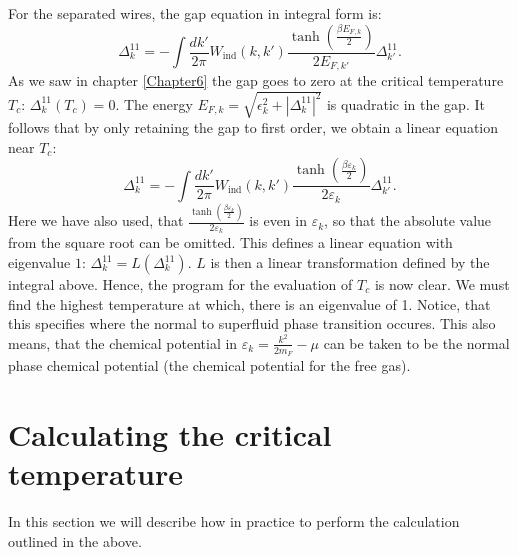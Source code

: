 For the separated wires, the gap equation in integral form is:
\begin{equation}
\Delta^{11}_k = - \int \frac{dk'}{2\pi} W_{\text{ind}}(k,k')\frac{\tanh\left(\frac{\beta E_{F,k}}{2}\right)}{2E_{F,k'}}\Delta^{11}_{k'}. \nonumber
\end{equation} 
As we saw in chapter \ref{Chapter6} the gap goes to zero at the critical temperature $T_c$: $\Delta^{11}_k(T_c) = 0$. The energy $E_{F,k} = \sqrt{\epsilon_k^2 + |\Delta^{11}_k|^2}$ is quadratic in the gap. It follows that by only retaining the gap to first order, we obtain a linear equation near $T_c$:
\begin{equation}
\Delta^{11}_k = - \int \frac{dk'}{2\pi} W_{\text{ind}}(k,k')\frac{\tanh\left(\frac{\beta \varepsilon_k}{2}\right)}{2\varepsilon_k} \Delta^{11}_{k'}.
\label{eq.GapequationIntegralLinear}
\end{equation} 
Here we have also used, that $\frac{\tanh\left(\frac{\beta \varepsilon_k}{2}\right)}{2\varepsilon_k}$ is even in $\varepsilon_k$, so that the absolute value from the square root can be omitted. This defines a linear equation with eigenvalue $1$: $\Delta^{11}_k = L(\Delta^{11}_k)$. $L$ is then a linear transformation defined by the integral above. Hence, the program for the evaluation of $T_c$ is now clear. We must find the highest temperature at which, there is an eigenvalue of 1. Notice, that this specifies where the normal to superfluid phase transition occures. This also means, that the chemical potential in $\varepsilon_k = \frac{k^2}{2m_F} - \mu$ can be taken to be the normal phase chemical potential (the chemical potential for the free gas). 

\section{Calculating the critical temperature} \label{sec.criticaltemperature.numerical}
In this section we will describe how in practice to perform the calculation outlined in the above. 

